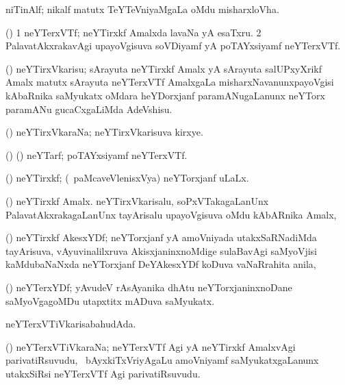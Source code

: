 \bentry
{}
\gl{\nA}
\bmng
niTinAlf; nikalf matutx TeYTeVniyaMgaLa oMdu misharxloVha. 
\emng
\eentry

\bentry
{}
\gl{\nA}
\bmng
(\ravi) 
\bnum
\num{1} neYTerxVTf; neYTirxkf Amalxda lavaNa yA esaTxru. 
\num{2} PalavatAkxrakavAgi upayoVgisuva soVDiyamf yA poTAYxsiyamf neYTerxVTf. 
\enum
\emng
\eentry

\bentry
{}
\gl{\sakirx}
\bmng
(\ravi) neYTirxVkarisu; sArayuta neYTirxkf Amalx yA sArayuta salUPxyXrikf Amalx matutx sArayuta neYTerxVTf AmalxgaLa misharxNavanunxpayoVgisi kAbaRnika saMyukatx oMdara heYDorxjanf paramANugaLanunx neYTorx paramANu gucaCxgaLiMda AdeVshisu. 
\emng
\eentry

\bentry
{}
\gl{\nA}
\bmng
(\ravi) neYTirxVkaraNa; neYTirxVkarisuva kirxye. 
\emng
\eentry

\bentry
{}
\gl{\nA}
\bmng
(\birx) (\ravi) neYTarf; poTAYxsiyamf neYTerxVTf. 
\emng
\eentry

\bentry
{}
\gl{\gu}
\bmng
(\ravi) neYTirxkf; (\kanmu\ paMcaveVlenisxVya) neYTorxjanf uLaLx. 
\emng
\eentry

\bentry
{}
\gl{\nA}
\bmng
(\ravi) neYTirxkf Amalx. neYTirxVkarisalu, soPxVTakagaLanUnx PalavatAkxrakagaLanUnx tayArisalu upayoVgisuva oMdu kAbARnika Amalx,  
\emng
\eentry

\bentry
{}
\gl{\nA}
\bmng
(\ravi) neYTirxkf AkesxYDf; neYTorxjanf yA amoVniyada utakxSaRNadiMda tayArisuva, vAyuvinalilxruva AkisxjaninxnoMdige sulaBavAgi saMyoVjisi kaMdubaNaNxda neYTorxjanf DeYAkesxYDf koDuva vaNaRrahita anila,  
\emng
\eentry

\bentry
{}
\gl{\nA}
\bmng
(\ravi) neYTerxYDf; yAvudeV rAsAyanika dhAtu neYTorxjaninxnoDane saMyoVgagoMDu utapxtitx mADuva saMyukatx. 
\emng
\eentry

\bentry
{}
\gl{\gu}
\bmng
neYTerxVTiVkarisabahudAda. 
\emng
\eentry

\bentry
{}
\gl{\nA}
\bmng
(\ravi) neYTerxVTiVkaraNa; neYTerxVTf Agi yA neYTirxkf AmalxvAgi parivatiRsuvudu, \kanmu\ bAyxkiTxVriyAgaLu amoVniyamf saMyukatxgaLanunx utakxSiRsi neYTerxVTf Agi parivatiRsuvudu. 
\emng
\eentry

